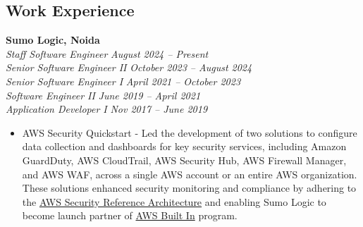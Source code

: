 \documentclass[margin,line]{resume}
\begin{document}
\begin{resume}
    \section{\mysidestyle Work Experience}
    \textbf{Sumo Logic, Noida}\\
        \textsl{Staff Software Engineer} \hfill \textsl{August 2024 -- Present}\vspace{0mm}\\\vspace{0mm}%
        \textsl{Senior Software Engineer II} \hfill \textsl{October 2023 -- August 2024}\vspace{0mm}\\\vspace{0mm}%
        \textsl{Senior Software Engineer I} \hfill \textsl{April 2021 -- October 2023}\vspace{0mm}\\\vspace{0mm}%
        \textsl{Software Engineer II} \hfill \textsl{June 2019 -- April 2021}\vspace{0mm}\\\vspace{0mm}%
        \textsl{Application Developer I} \hfill \textsl{Nov 2017 -- June 2019}\vspace{1mm}%
        \begin{itemize}
            \item AWS Security Quickstart - Led the development of two solutions to configure data collection and dashboards for key security services, including Amazon GuardDuty, AWS CloudTrail, AWS Security Hub, AWS Firewall Manager, and AWS WAF, across a single AWS account or an entire AWS organization. These solutions enhanced security monitoring and compliance by adhering to the \href{https://docs.aws.amazon.com/prescriptive-guidance/latest/security-reference-architecture/welcome.html}{AWS Security Reference Architecture} and enabling Sumo Logic to become launch partner of \href{https://www.sumologic.com/blog/security-aws-built-in-competency/}{AWS Built In} program.

\end{itemize}
\end{resume}
\end{document}
